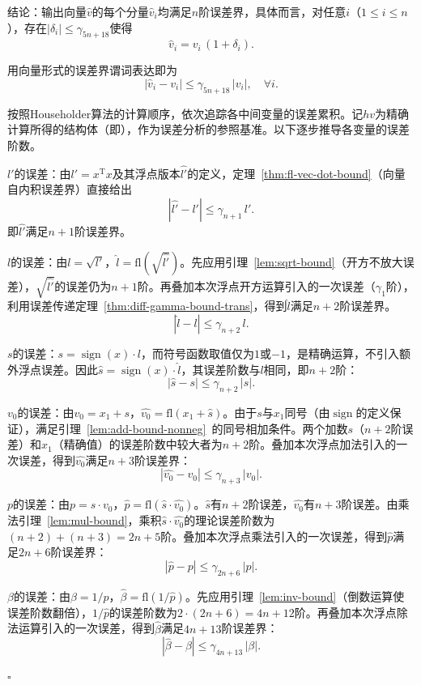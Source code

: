 ﻿\documentclass[UTF8,a4paper,openany]{ctexbook}
\DeclareMathOperator{\sign}{sign}
\theoremstyle{qrplain}
\renewenvironment{proof}[1][证明]
{\par\noindent{\qrthmchinese\bfseries #1. }\ignorespaces}
{\hfill$\square$\par}
\begin{document}
结论：输出向量$\hat{v}$的每个分量$\hat{v}_i$均满足$n$阶误差界，具体而言，对任意$i$（$1\le i\le n$），存在$|\delta_i|\le\gamma_{5n+18}$使得
$$
\hat{v}_i = v_i\,(1+\delta_i).
$$

用向量形式的误差界谓词表达即为
$$
\bigl|\hat{v}_i - v_i\bigr| \le \gamma_{5n+18}\,|v_i|,\quad \forall i.
$$

\begin{proof}
按照Householder算法的计算顺序，依次追踪各中间变量的误差累积。记$hv$为精确计算所得的结构体（即），作为误差分析的参照基准。以下逐步推导各变量的误差阶数。

$l'$的误差：由$l'=x^\mathrm{T}x$及其浮点版本$\hat{l'}$的定义，定理~\ref{thm:fl-vec-dot-bound}（向量自内积误差界）直接给出
$$
|\hat{l'} - l'| \le \gamma_{n+1}\,l'.
$$
即$\hat{l'}$满足$n+1$阶误差界。

$l$的误差：由$l=\sqrt{l'}$，$\hat{l}=\mathrm{fl}(\sqrt{\hat{l'}})$。先应用引理~\ref{lem:sqrt-bound}（开方不放大误差），$\sqrt{\hat{l'}}$的误差仍为$n+1$阶。再叠加本次浮点开方运算引入的一次误差（$\gamma_1$阶），利用误差传递定理~\ref{thm:diff-gamma-bound-trans}，得到$\hat{l}$满足$n+2$阶误差界。
$$
|\hat{l} - l| \le \gamma_{n+2}\,l.
$$

$s$的误差：$s=\sign(x)\cdot l$，而符号函数取值仅为$1$或$-1$，是精确运算，不引入额外浮点误差。因此$\hat{s}=\sign(x)\cdot\hat{l}$，其误差阶数与$l$相同，即$n+2$阶：
$$
|\hat{s} - s| \le \gamma_{n+2}\,|s|.
$$

$v_0$的误差：由$v_0=x_1+s$，$\hat{v_0}=\mathrm{fl}(x_1+\hat{s})$。由于$s$与$x_1$同号（由$\sign$的定义保证），满足引理~\ref{lem:add-bound-nonneg}~的同号相加条件。两个加数$s$（$n+2$阶误差）和$x_1$（精确值）的误差阶数中较大者为$n+2$阶。叠加本次浮点加法引入的一次误差，得到$\hat{v_0}$满足$n+3$阶误差界：
$$
|\hat{v_0} - v_0| \le \gamma_{n+3}\,|v_0|.
$$

$p$的误差：由$p=s\cdot v_0$，$\hat{p}=\mathrm{fl}(\hat{s}\cdot\hat{v_0})$。$\hat{s}$有$n+2$阶误差，$\hat{v_0}$有$n+3$阶误差。由乘法引理~\ref{lem:mul-bound}，乘积$\hat{s}\cdot\hat{v_0}$的理论误差阶数为$(n+2)+(n+3)=2n+5$阶。叠加本次浮点乘法引入的一次误差，得到$\hat{p}$满足$2n+6$阶误差界：
$$
|\hat{p} - p| \le \gamma_{2n+6}\,|p|.
$$

$\beta$的误差：由$\beta=1/p$，$\hat{\beta}=\mathrm{fl}(1/\hat{p})$。先应用引理~\ref{lem:inv-bound}（倒数运算使误差阶数翻倍），$1/\hat{p}$的误差阶数为$2\cdot(2n+6)=4n+12$阶。再叠加本次浮点除法运算引入的一次误差，得到$\hat{\beta}$满足$4n+13$阶误差界：
$$
|\hat{\beta} - \beta| \le \gamma_{4n+13}\,|\beta|.
$$


\end{proof}
\end{document}
